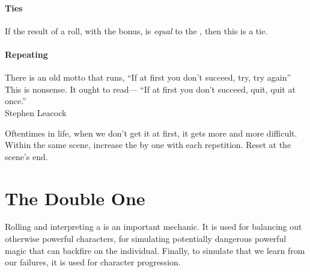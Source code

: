\paragraph*{Ties}
If the result of a roll, with the bonus, is \emph{equal} to the \acronymDL,
then this is a tie.

\paragraph*{Repeating}

\begin{emphasisParagraph}
There is an old motto that runs, ``If at first you don't succeed, try, try again'' This is nonsense. It ought to read— ``If at first you don't succeed, quit, quit at once.''\\
Stephen Leacock
\end{emphasisParagraph}

Oftentimes in life, when we don't get it at first, it gets more and more difficult.
Within the same scene, increase the \acronymDL by one with each repetition.
Reset at the scene's end.


% 	





\section{The Double One}
\label{sec:the_double_one}

Rolling and interpreting a  is an important
mechanic. It is used for balancing out otherwise powerful
characters, for simulating potentially dangerous powerful magic
that can backfire on the individual. Finally, to simulate
that we learn from our failures, it is used for character
progression.

